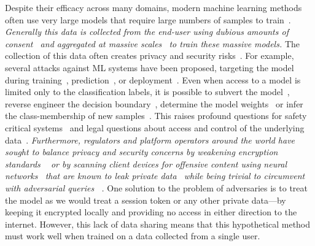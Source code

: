 \documentclass[conference]{IEEEtran}
\newcommand{\cm}[1]{\textit{{\color{blue}#1}}}
\begin{document}
Despite their efficacy across many domains, modern machine learning methods often use very large models that require large numbers of samples to train~\cite{desislavov2021compute}.  
\cm{Generally this data is collected from the end-user using dubious amounts of consent~\cite{nouwens2020dark} and aggregated at massive scales~\cite{desislavov2021compute} to train these massive models.} 
The collection of this data often creates privacy and security risks~\cite{chakraborty_adversarial_2018,meyers}. 
For example, several attacks against ML systems have been proposed, targeting the model during training~\cite{biggio_poisoning_2013}, prediction~\cite{biggio_evasion_2013,deepfool,carlini_towards_2017}, or deployment~\cite{distributed_attacks,santos2021universal}.
Even when access to a model is limited only to the classification labels, it is possible to subvert the model~\cite{hopskipjump}, reverse engineer the decision boundary~\cite{deepfool}, determine the model weights~\cite{jagielski2020high} or infer the class-membership of new samples~\cite{bentley2020quantifying}. 
This raises profound questions for safety critical systems~\cite{meyers} and legal questions about access and control of the underlying data~\cite{mitrou2018data,marks2023ai}. 
\cm{
Furthermore, regulators and platform operators around the world have sought to balance privacy and security concerns by weakening encryption standards ~\cite{amnesty_encryption} or by scanning client devices for offensive content using neural networks~\cite{chat_control} that are known to leak private data~\cite{xiao2021improving,fredrikson_model_2015} while being trivial to circumvent with adversarial queries ~\cite{carlini_towards_2017,dohmatob_generalized_2019,hopskipjump,biggio_evasion_2013,meyers,chakraborty_adversarial_2018}.
}
One solution to the problem of adversaries is to treat the model as we would treat a session token or any other private data---by keeping it encrypted locally and providing no access in either direction to the internet.
However, this lack of data sharing means that this hypothetical method must work well when trained on a data collected from a single user.
\end{document}
